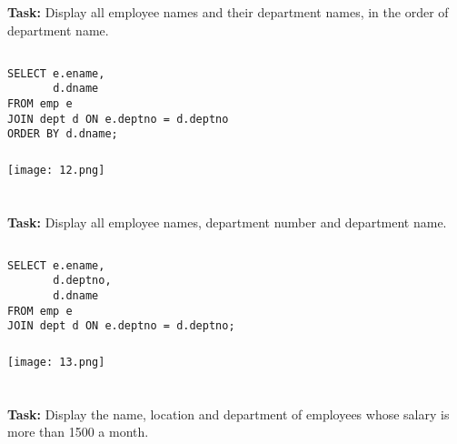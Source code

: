 \documentclass[12pt,a4paper]{article}
\begin{document}

\section{}
\textbf{Task:} Display all employee names and their department names, in the order of
department name.

\subsection{}
\begin{lstlisting}
SELECT e.ename,
       d.dname
FROM emp e
JOIN dept d ON e.deptno = d.deptno
ORDER BY d.dname;
\end{lstlisting}

\subsubsection{}
\begin{center}
    \texttt{[image: 12.png]}
\end{center}


\section{}
\textbf{Task:} Display all employee names, department number and department name.

\subsection{}
\begin{lstlisting}
SELECT e.ename,
       d.deptno,
       d.dname
FROM emp e
JOIN dept d ON e.deptno = d.deptno;
\end{lstlisting}

\subsubsection{}
\begin{center}
    \texttt{[image: 13.png]}
\end{center}


\section{}
\textbf{Task:} Display the name, location and department of employees whose salary is
more than 1500 a month.
\end{document}
